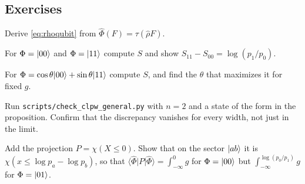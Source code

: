 \subsection*{Exercises}
\begin{exercise}\label{ex:qubit:1}
Derive \eqref{eq:rhoqubit} from $\hat\Phi(F)=\tau(\hat\rho F)$.
\end{exercise}
\begin{exercise}\label{ex:qubit:2}
For $\Phi=\lvert 00\rangle$ and $\Phi=\lvert 11\rangle$ compute $S$ and show $S_{11}-S_{00}=\log(p_1/p_0)$.
\end{exercise}
\begin{exercise}\label{ex:qubit:3}
For $\Phi=\cos\theta\lvert 00\rangle+\sin\theta\lvert 11\rangle$ compute $S$, and find the $\theta$ that maximizes it for fixed $g$.
\end{exercise}
\begin{exercise}\label{ex:qubit:4}
Run \texttt{scripts/check\_clpw\_general.py} with $n=2$ and a state of the form in the proposition. Confirm that the discrepancy vanishes for every width, not just in the limit.
\end{exercise}
\begin{exercise}\label{ex:qubit:5}
Add the projection $P=\chi(X\le0)$. Show that on the sector $\lvert ab\rangle$ it is $\chi(x\le\log p_a-\log p_b)$, so that $\langle\hat\Phi|P|\hat\Phi\rangle=\int_{-\infty}^0g$ for $\Phi=\lvert 00\rangle$ but $\int_{-\infty}^{\log(p_0/p_1)}g$ for $\Phi=\lvert 01\rangle$.
\end{exercise}
